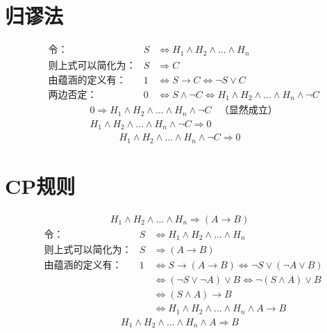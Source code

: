 \documentclass{ctexart}
\begin{document}
\section{归谬法}
\begin{align*}
&\text{令：} &S &\Leftrightarrow H_1 \land H_2 \land ... \land H_n \\
&\text{则上式可以简化为：} &S &\Rightarrow C \\
&\text{由蕴涵的定义有：} &1 &\Leftrightarrow S \rightarrow C \Leftrightarrow \lnot S \lor C \\
&\text{两边否定：} &0 &\Leftrightarrow S \land \lnot C \Leftrightarrow H_1 \land H_2 \land ... \land H_n \land \lnot C
\end{align*}
\begin{align*}
&0 \Rightarrow H_1 \land H_2 \land ... \land H_n \land \lnot C &\text{（显然成立）} \\
&H_1 \land H_2 \land ... \land H_n \land \lnot C \Rightarrow 0
\end{align*}
\begin{align*}
H_1 \land H_2 \land ... \land H_n \land \lnot C \Rightarrow 0
\end{align*}

\newpage

\section{CP规则}
\begin{align*}
H_1 \land H_2 \land ... \land H_n \Rightarrow (A \rightarrow B)
\end{align*}
\begin{align*}
&\text{令：} &S & \Leftrightarrow H_1 \land H_2 \land ... \land H_n \\
&\text{则上式可以简化为：} &S & \Rightarrow (A \rightarrow B) \\
&\text{由蕴涵的定义有：} &1 &\Leftrightarrow S \rightarrow (A \rightarrow B) \Leftrightarrow \lnot S \lor (\lnot A \lor B) \\
& & &\Leftrightarrow (\lnot S \lor \lnot A) \lor B \Leftrightarrow \lnot (S \land A) \lor B \\
& & &\Leftrightarrow (S \land A) \rightarrow B \\
& & &\Leftrightarrow H_1 \land H_2 \land ... \land H_n \land A \rightarrow B
\end{align*}
\begin{align*}
H_1 \land H_2 \land ... \land H_n \land A \Rightarrow B
\end{align*}
\end{document}
